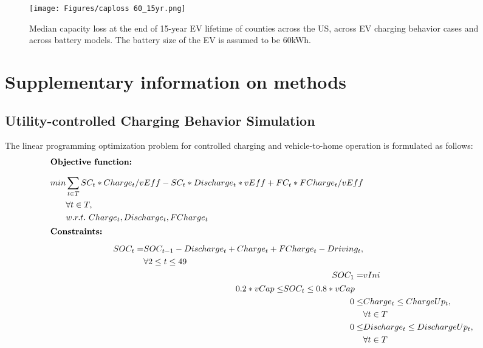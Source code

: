 \documentclass[11pt,preprint]{elsarticle}
\begin{document}
\begin{figure}[H]
    \centering 
    \texttt{[image: Figures/caploss 60\_15yr.png]} 
    \caption{Median capacity loss at the end of 15-year EV lifetime of counties across the US, across EV charging behavior cases and across battery models. The battery size of the EV is assumed to be 60kWh.} 
    \label{fig:caploss60} 
\end{figure}

\newpage

\section{Supplementary information on methods}

\subsection{Utility-controlled Charging Behavior Simulation}

The linear programming optimization problem for controlled charging and vehicle-to-home operation is formulated as follows:\\

\begin{align}
\intertext{\smallskip\newline \textbf{Objective function:}  \smallskip\newline}
\begin{split}\label{eq:1}
    min{}& \sum_{t\in T}{SC_{t}*Charge_{t}/vEff-SC_{t}*Discharge_{t}*vEff+FC_{t}*FCharge_{t}/vEff}\\
        & \forall t \in T, \\
        & w.r.t.\text{ } Charge_{t},Discharge_{t},FCharge_{t}
\end{split}\\
\intertext{\smallskip\newline \textbf{Constraints:} \smallskip\newline} 
\begin{split}\label{eq:SOC}
    SOC_{t} = & SOC_{t-1} - Discharge_{t} + Charge_{t}+FCharge_{t}-Driving_{t},\\
    &\forall 2 \leq t \leq 49
\end{split}\\
    SOC_{1} = & vIni \label{eq:ini}\\
\begin{split}\label{eq:socrange}
    0.2 * vCap \leq &SOC_{t} \leq 0.8* vCap
\end{split}\\
0 \leq & Charge_{t} \leq ChargeUp_{t},\label{eq:charg}\\
&\forall t \in T\\
0 \leq & Discharge_{t} \leq DischargeUp_{t},\label{eq:disc}\\
&\forall t \in T
\end{align}
\end{document}
